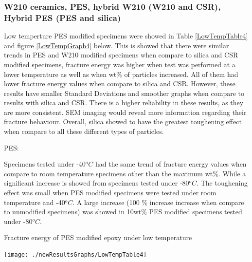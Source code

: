\documentclass[numbers=noendperiod,chapterprefix=on]{icldt} %
\begin{document}
\subsubsection{W210 ceramics, PES, hybrid W210 (W210 and CSR), Hybrid PES (PES and silica)}
Low temperture PES modified specimens were showed in Table \ref{LowTempTable4} and figure \ref{LowTempGraph4} below.
This is showed that there were similar trends in PES and W210 modified specimens when compare to silica and CSR modified specimens, fracture energy was higher when test was performed at a lower temperature as well as when wt\% of particles increased. All of them had lower fracture energy values when compare to silica and CSR. However, these results have smaller Standard Deviations and smoother graphs when compare to results with silica and CSR. There is a higher reliability in these results, as they are more consistent. SEM imaging would reveal more information regarding their fracture behaviour. Overall, silica showed to have the greatest toughening effect when compare to all these different types of particles.

PES:

Specimens tested under -40$^oC$ had the same trend of fracture energy values when compare to room temperature specimens other than the maximum wt\%. While a significant increase is showed from specimens tested under -80$^oC$. The toughening effect was small when PES modified specimens were tested under room temperature and -40$^oC$. A large increase (100 \% increase increase when compare to unmodified specimens) was showed in 10wt\% PES modified specimens tested under -80$^oC$. 

\begin{table}[!hp]
\centering
\caption{Fracture energy of PES modified epoxy under low temperature} \label{LowTempTable4}
\texttt{[image: ./newResultsGraphs/LowTempTable4]}
\end{table}
\FloatBarrier
\end{document}
